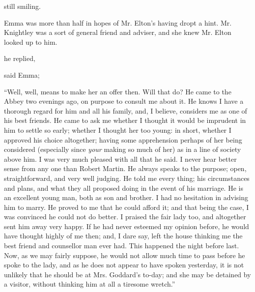 
 still smiling.


Emma was more than half in hopes of Mr. Elton's having dropt a hint. Mr. Knightley was a sort of general friend and adviser, and she knew Mr. Elton looked up to him.

 he replied, 

 said Emma; 

“Well, well, means to make her an offer then. Will that do? He came to the Abbey two evenings ago, on purpose to consult me about it. He knows I have a thorough regard for him and all his family, and, I believe, considers me as one of his best friends. He came to ask me whether I thought it would be imprudent in him to settle so early; whether I thought her too young: in short, whether I approved his choice altogether; having some apprehension perhaps of her being considered (especially since {\em your} making so much of her) as in a line of society above him. I was very much pleased with all that he said. I never hear better sense from any one than Robert Martin. He always speaks to the purpose; open, straightforward, and very well judging. He told me every thing; his circumstances and plans, and what they all proposed doing in the event of his marriage. He is an excellent young man, both as son and brother. I had no hesitation in advising him to marry. He proved to me that he could afford it; and that being the case, I was convinced he could not do better. I praised the fair lady too, and altogether sent him away very happy. If he had never esteemed my opinion before, he would have thought highly of me then; and, I dare say, left the house thinking me the best friend and counsellor man ever had. This happened the night before last. Now, as we may fairly suppose, he would not allow much time to pass before he spoke to the lady, and as he does not appear to have spoken yesterday, it is not unlikely that he should be at Mrs. Goddard's to-day; and she may be detained by a visitor, without thinking him at all a tiresome wretch.”

